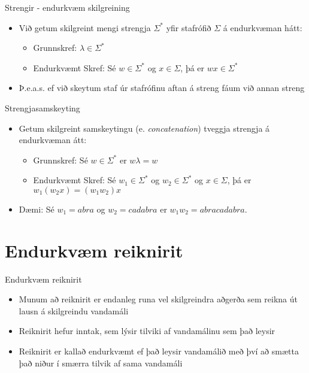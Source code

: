 \documentclass[handout]{beamer}
\begin{document}
\begin{frame}{Strengir - endurkvæm skilgreining}
\begin{itemize}
 \item Við getum skilgreint mengi strengja $\Sigma^*$ yfir stafrófið $\Sigma$ á endurkvæman hátt:
 \begin{itemize}
  \item Grunnskref: $\lambda \in \Sigma^*$
  \item Endurkvæmt Skref: Sé $w \in \Sigma^*$ og $x \in \Sigma$, þá er $wx \in \Sigma^*$
 \end{itemize}
 \item Þ.e.a.s. ef við skeytum staf úr stafrófinu aftan á streng fáum við annan streng
\end{itemize}
\end{frame}

\begin{frame}{Strengjasamskeyting}
\begin{itemize}
 \item Getum skilgreint samskeytingu (e. \emph{concatenation}) tveggja strengja á endurkvæman átt:
 \begin{itemize}
  \item Grunnskref: Sé $w \in \Sigma^*$ er $w\lambda = w$
  \item Endurkvæmt Skref: Sé $w_1 \in \Sigma^*$ og $w_2 \in \Sigma^*$ og $x \in \Sigma$, þá er $w_1(w_2x) = (w_1w_2)x$
 \end{itemize}
 \item Dæmi: Sé $w_1 = abra$ og $w_2 = cadabra$ er $w_1w_2 = abracadabra$.
\end{itemize}
\end{frame}

\section{Endurkvæm reiknirit}

\begin{frame}{Endurkvæm reiknirit}
\begin{itemize}
 \item Munum að reiknirit er endanleg runa vel skilgreindra aðgerða sem reikna út lausn á skilgreindu vandamáli
 \item Reiknirit hefur inntak, sem lýsir tilviki af vandamálinu sem það leysir
 \item Reiknirit er kallað endurkvæmt ef það leysir vandamálið með því að smætta það niður í smærra tilvik af sama vandamáli
\end{itemize}
\end{frame}
\end{document}
